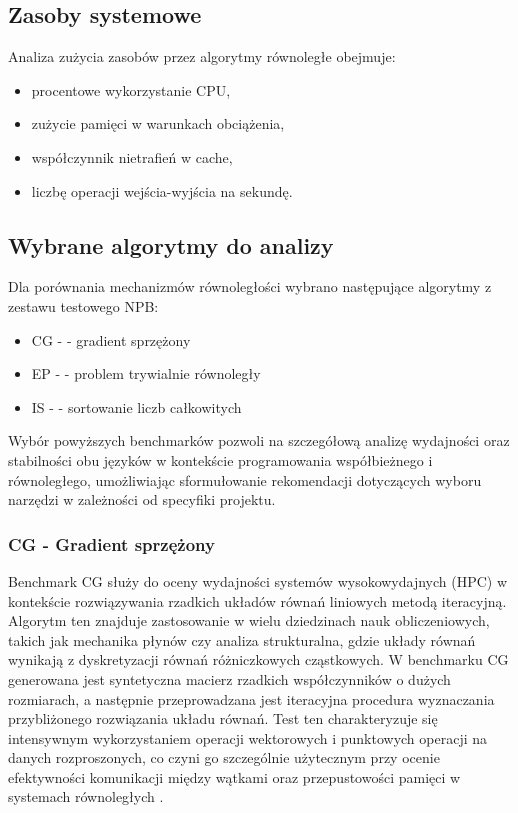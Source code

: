 \subsection{Zasoby systemowe}
Analiza zużycia zasobów przez algorytmy równoległe obejmuje:
\begin{itemize}
\item procentowe wykorzystanie CPU,
\item zużycie pamięci w warunkach obciążenia,
\item współczynnik nietrafień w cache,
\item liczbę operacji wejścia-wyjścia na sekundę.
\end{itemize}

\subsection{Wybrane algorytmy do analizy}
Dla porównania mechanizmów równoległości wybrano następujące algorytmy z zestawu testowego NPB:
\begin{itemize}
    \item CG -  - gradient sprzężony
    \item EP -  - problem trywialnie równoległy
    \item IS -  - sortowanie liczb całkowitych
\end{itemize}

Wybór powyższych benchmarków pozwoli na szczegółową analizę wydajności oraz stabilności obu języków w kontekście programowania współbieżnego i równoległego, umożliwiając sformułowanie rekomendacji dotyczących wyboru narzędzi w zależności od specyfiki projektu.

\subsubsection{CG - Gradient sprzężony}
Benchmark CG  służy do oceny wydajności systemów wysokowydajnych (HPC) w kontekście rozwiązywania rzadkich układów równań liniowych metodą iteracyjną. Algorytm ten znajduje zastosowanie w wielu dziedzinach nauk obliczeniowych, takich jak mechanika płynów czy analiza strukturalna, gdzie układy równań wynikają z dyskretyzacji równań różniczkowych cząstkowych. W benchmarku CG generowana jest syntetyczna macierz rzadkich współczynników o dużych rozmiarach, a następnie przeprowadzana jest iteracyjna procedura wyznaczania przybliżonego rozwiązania układu równań. Test ten charakteryzuje się intensywnym wykorzystaniem operacji wektorowych i punktowych operacji na danych rozproszonych, co czyni go szczególnie użytecznym przy ocenie efektywności komunikacji między wątkami oraz przepustowości pamięci w systemach równoległych \cite{nasaParallelBenchmarks}.

